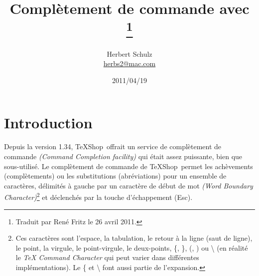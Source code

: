 \documentclass[11pt,french]{article}
\title{Complètement de commande avec \\ \TS\thanks{Traduit par René Fritz le 26 avril 2011.}}
\author{Herbert Schulz\\\small\href{mailto:herbs2@mac.com}{herbs2@mac.com}}
\date{2011/04/19}
\newcommand{\esckey}{\textsf{Esc}}
\newcommand{\TS}{\textsf{\TeX Shop}}
\begin{document}
\maketitle
\thispagestyle{empty}

\section*{Introduction}

Depuis la version 1.34, \TS\ offrait un service de complètement de commande \emph{(Command Completion 
facility)} qui était assez puissante, bien que sous-utilisé. Le complètement de commande de \TS\ permet les achèvements (complètements) ou les substitutions (abréviations) pour un ensemble de caractères, délimités à gauche par un caractère de début de mot \emph{(Word Boundary Character)}\footnote{Ces caractères sont l'espace, la tabulation, le retour à la ligne (saut de ligne), le point, la virgule, le point-virgule, le deux-points, \{, \}, (, ) ou \textbackslash{} (en réalité le \textsf{\emph{TeX Command Character}} qui peut varier dans différentes implémentations). Le \{{} et \textbackslash{} font aussi partie de l'expansion.} et déclenchés par la touche d'échappement (\esckey).

\end{document}
